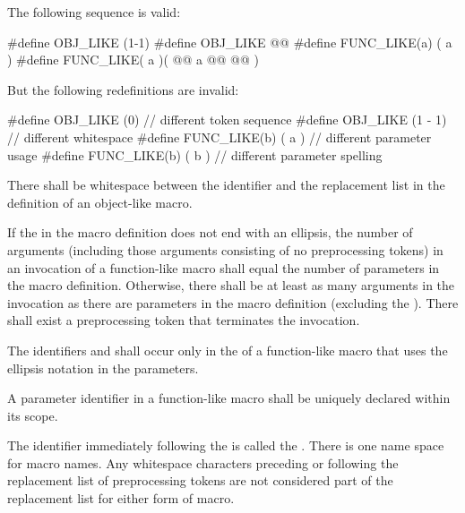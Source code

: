\pnum
\begin{example}
The following sequence is valid:
\begin{codeblock}
#define OBJ_LIKE      (1-1)
#define OBJ_LIKE      @@
#define FUNC_LIKE(a)   ( a )
#define FUNC_LIKE( a )(     @@
                a @@
                  @\tcode{*/}@ )
\end{codeblock}
But the following redefinitions are invalid:
\begin{codeblock}
#define OBJ_LIKE    (0)         // different token sequence
#define OBJ_LIKE    (1 - 1)     // different whitespace
#define FUNC_LIKE(b) ( a )      // different parameter usage
#define FUNC_LIKE(b) ( b )      // different parameter spelling
\end{codeblock}
\end{example}

\pnum
{}%
There shall be whitespace between the identifier and the replacement list
in the definition of an object-like macro.

\pnum
If the  in the macro definition does not end with
an ellipsis, the number of arguments (including those arguments consisting
of no preprocessing tokens)
in an invocation of a function-like macro shall
equal the number of parameters in the macro definition.
Otherwise, there shall be at least as many arguments in the invocation as there are
parameters in the macro definition (excluding the ). There
shall exist a
\tcode{)}
preprocessing token that terminates the invocation.

\pnum
{}%
%
The identifiers  and 
shall occur only in the 
of a function-like macro that uses the ellipsis notation in the parameters.

\pnum
A parameter identifier in a function-like macro
shall be uniquely declared within its scope.

\pnum
The identifier immediately following the
is called the
%
.
There is one name space for macro names.
Any whitespace characters preceding or following the
replacement list of preprocessing tokens are not considered
part of the replacement list for either form of macro.

